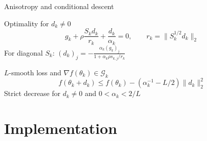 \documentclass[aspectratio=169,xcolor=table]{beamer}
\begin{document}
\begin{frame}{Anisotropy and conditional descent}
    \begin{block}{Optimality for \(d_k\ne 0\)}
        \[
            g_k+\rho\frac{S_kd_k}{r_k}+\frac{d_k}{\alpha_k}=0,
            \qquad r_k=\|S_k^{1/2}d_k\|_2
        \]
        For diagonal \(S_k\):
        \(\displaystyle
            (d_k)_j=-\frac{\alpha_k(g_k)_j}{1+\alpha_k\rho s_{k,j}/r_k}
        \)
    \end{block}
    \begin{block}{\(L\)-smooth loss and \(\nabla f(\theta_k)\in\mathcal G_k\)}
        \[
            f(\theta_k+d_k)\le f(\theta_k)-
            \left(\alpha_k^{-1}-L/2\right)\|d_k\|_2^2
        \]
        Strict decrease for \(d_k\ne 0\) and \(0<\alpha_k<2/L\)
    \end{block}
\end{frame}

\section{Implementation}
\end{document}
